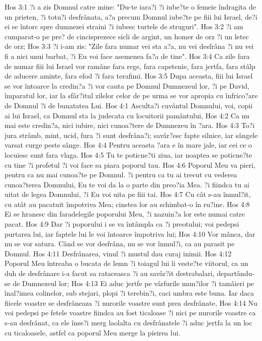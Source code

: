 Hos 3:1  ?i a zis Domnul catre mine: "Du-te iara?i ?i iube?te o femeie îndragita de un prieten, ?i totu?i desfrânata, a?a precum Domnul iube?te pe fiii lui Israel, de?i ei se întorc spre dumnezei straini ?i iubesc turtele de struguri".
Hos 3:2  ?i am cumparat-o pe pre? de cincisprezece sicli de argint, un homer de orz ?i un letec de orz;
Hos 3:3  ?i i-am zis: "Zile fara numar vei sta a?a, nu vei desfrâna ?i nu vei fi a nici unui barbat, ?i Eu voi face asemenea fa?a de tine".
Hos 3:4  Ca zile fara de numar fiii lui Israel vor ramâne fara rege, fara capetenie, fara jertfa, fara stâlp de aducere aminte, fara efod ?i fara terafimi.
Hos 3:5  Dupa aceasta, fiii lui Israel se vor întoarce la credin?a ?i vor cauta pe Domnul Dumnezeul lor, ?i pe David, împaratul lor, iar la sfâr?itul zilelor celor de pe urma se vor apropia cu înfrico?are de Domnul ?i de bunatatea Lui.
Hos 4:1  Asculta?i cuvântul Domnului, voi, copii ai lui Israel, ca Domnul sta la judecata cu locuitorii pamântului,
Hos 4:2  Ca nu mai este credin?a, nici iubire, nici cunoa?tere de Dumnezeu în ?ara.
Hos 4:3  To?i jura strâmb, mint, ucid, fura ?i sunt desfrâna?i; savâr?esc fapte silnice, iar sângele varsat curge peste sânge.
Hos 4:4  Pentru aceasta ?ara e în mare jale, iar cei ce o locuiesc sunt fara vlaga.
Hos 4:5  Tu te poticne?ti ziua, iar noaptea se poticne?te cu tine ?i profetul ?i voi face sa piara poporul tau.
Hos 4:6  Poporul Meu va pieri, pentru ca nu mai cunoa?te pe Domnul. ?i pentru ca tu ai trecut cu vederea cunoa?terea Domnului, Eu te voi da la o parte din preo?ia Mea. ?i fiindca tu ai uitat de legea Domnului, ?i Eu voi uita pe fiii tai.
Hos 4:7  Cu cât s-au înmul?it, cu atât au pacatuit împotriva Mea; cinstea lor au schimbat-o în ru?ine.
Hos 4:8  Ei se hranesc din faradelegile poporului Meu, ?i nazuin?a lor este numai catre pacat.
Hos 4:9  Dar ?i poporului i se va întâmpla ca ?i preotului; voi pedepsi purtarea lui, iar faptele lui le voi întoarce împotriva lui;
Hos 4:10  Vor mânca, dar nu se vor satura. Când se vor desfrâna, nu se vor înmul?i, ca au parasit pe Domnul.
Hos 4:11  Desfrânarea, vinul ?i mustul dau curaj inimii.
Hos 4:12  Poporul Meu întreaba o bucata de lemn ?i toiagul lui îi veste?te viitorul, ca un duh de desfrânare i-a facut sa rataceasca ?i au savâr?it destrabalari, departându-se de Dumnezeul lor;
Hos 4:13  Ei aduc jertfe pe vârfurile mun?ilor ?i tamâieri pe înal?imea colinelor, sub stejari, plopi ?i terebin?i, caci umbra este buna. Iar daca fiicele voastre se desfrâneaza ?i nurorile voastre sunt prea desfrânate,
Hos 4:14  Nu voi pedepsi pe fetele voastre fiindca au fost ticaloase ?i nici pe nurorile voastre ca s-au desfrânat, ca ele înse?i merg laolalta cu desfrânatele ?i aduc jertfa la un loc cu ticaloasele, astfel ca poporul Meu merge la pieirea lui.
